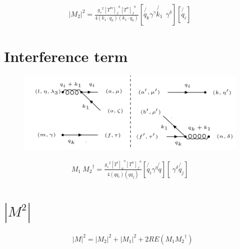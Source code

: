 \begin{equation}
\begin{split}
|M_2|^2=\frac{{g_s}^2 {[T^m]_f}^b {[T^n]_{f}}^{b}}{4(k_1 \cdot q_k)(k_1\cdot q_k)}[\not{q_k}{\gamma}^{\gamma}\not{k_1}\:\: {\gamma}^{{\delta}}][\not{q_i}]
\end{split}
\end{equation}

\pagebreak

\section{Interference term}
\begin{figure}[ht!]
\centering
\includegraphics[scale=0.7]{images/QG/M1M2Dagger.png}
\end{figure}


\begin{equation}
\begin{split}
M_1\: {M_2}^{\dagger}=\frac{{g_s}^2 {[T^l]_a}^o {[T^n]_{f}}^{o}}{4(qq_i)(qq_j)}[\not{q_i}{\gamma}^{\eta}\not{q}][\: {\gamma}^{{\delta}}\not{q_j}]
\end{split}
\end{equation}


\section{$|M^{2}|$}

\begin{equation}
\begin{split}
&|M|^{2}=|{M}_2|^{2}+|{M}_1|^{2}+2RE(M_1{M_2}^{\dagger})\\
\end{split}
\end{equation}